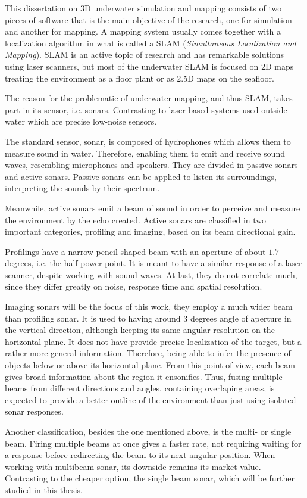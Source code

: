 This dissertation on 3D underwater simulation and mapping consists of two pieces
of software that is the main objective of the research, one for simulation and
another for mapping. A mapping system usually comes together with a localization
algorithm in what is called a SLAM (\textit{Simultaneous Localization and
Mapping}). SLAM is an active topic of research and has remarkable solutions
using laser scanners,
but most of the underwater SLAM is focused on 2D maps treating the environment
as a floor plant or as 2.5D maps on the seafloor.

The reason for the problematic of underwater mapping, and thus SLAM, takes part
in its sensor, i.e. sonars. Contrasting to laser-based systems used outside
water which are precise low-noise sensors.

The standard sensor, sonar, is composed of hydrophones which allows them to
measure sound in water. Therefore, enabling them to emit and receive sound
waves, resembling microphones and speakers. They are divided in passive sonars
and active sonars. Passive sonars can be applied to listen its surroundings,
interpreting the sounds by their spectrum.

Meanwhile, active sonars emit a beam of sound in order to perceive  and measure
the environment by the echo created. Active sonars are classified in two
important categories, profiling and imaging, based on its beam directional gain.

Profilings have a narrow pencil shaped beam  with an aperture of about $1.7$
degrees, i.e. the half power point. It is meant to have a similar response of a
laser scanner, despite working with sound waves. At last, they do not correlate
much, since they differ greatly on noise, response time and
spatial resolution.

Imaging sonars will be the focus of this work, they  employ a much wider beam
than profiling sonar. It is used to having around $3$ degrees angle of aperture
in the vertical direction, although keeping its same angular resolution on the
horizontal plane.
It does not have provide precise localization of the target, but a rather more
general information. Therefore, being able to infer the presence of objects
below or above its horizontal plane.
From this point of view, each beam gives broad  information about the region it
ensonifies. Thus, fusing multiple beams from different directions and angles,
containing overlaping areas,  is expected to provide a better outline of the
environment than just using isolated sonar responses.

Another classification, besides the one mentioned above, is the multi- or single
beam. Firing multiple beams at once gives a faster rate, not requiring waiting
for a response before redirecting the beam to its next angular position. When
working with multibeam sonar, its downside remains its market value. Contrasting
to the cheaper option, the single beam sonar, which will be further studied in
this thesis.